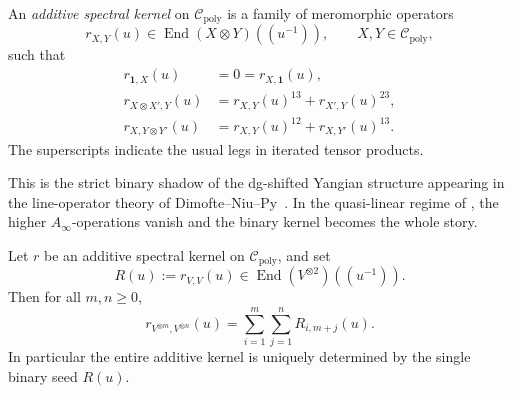 \begin{definition}
\label{def:additive-spectral-kernel}
An \emph{additive spectral kernel} on $\mathcal C_{\mathrm{poly}}$ is a
family of meromorphic operators
\begin{equation}
r_{X,Y}(u)\in \operatorname{End}(X\otimes Y)((u^{-1})),
\qquad X,Y\in \mathcal C_{\mathrm{poly}},
\end{equation}
such that
\begin{align}
r_{\mathbf 1,X}(u)&=0=r_{X,\mathbf 1}(u),
\label{eq:additive-kernel-unit}\\
r_{X\otimes X',Y}(u)&=r_{X,Y}(u)^{13}+r_{X',Y}(u)^{23},
\label{eq:additive-kernel-left}\\
r_{X,Y\otimes Y'}(u)&=r_{X,Y}(u)^{12}+r_{X,Y'}(u)^{13}.
\label{eq:additive-kernel-right}
\end{align}
The superscripts indicate the usual legs in iterated tensor products.
\end{definition}

This is the strict binary shadow of the dg-shifted Yangian structure
appearing in the line-operator theory of
Dimofte--Niu--Py~\cite{DNP25}.  In the quasi-linear regime of
\cite{DNP25}, the higher $A_\infty$-operations vanish and the binary
kernel becomes the whole story.

\begin{theorem}
\ClaimStatusProvedHere
\label{thm:vector-seed-propagation}
Let $r$ be an additive spectral kernel on
$\mathcal C_{\mathrm{poly}}$, and set
\begin{equation}
R(u):=r_{V,V}(u)\in \operatorname{End}(V^{\otimes 2})((u^{-1})).
\end{equation}
Then for all $m,n\ge 0$,
\begin{equation}
\label{eq:vector-seed-propagation}
r_{V^{\otimes m},V^{\otimes n}}(u)
=
\sum_{i=1}^m\sum_{j=1}^n R_{i,m+j}(u).
\end{equation}
In particular the entire additive kernel is uniquely determined by the
single binary seed $R(u)$.
\end{theorem}

